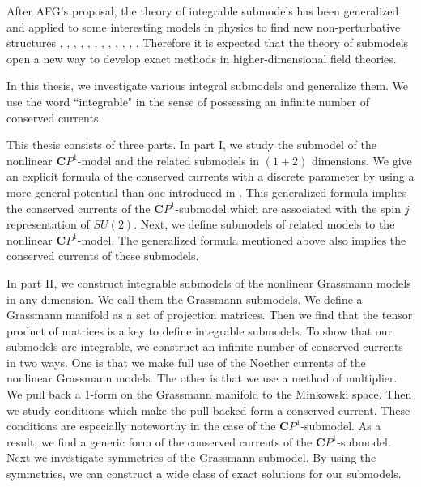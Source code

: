 \documentclass[makeidx,12pt,openany]{report}
\begin{document}
After AFG's proposal, the theory of integrable submodels has been generalized 
and applied to some interesting models in physics to find new non-perturbative 
structures \cite{FS1}, \cite{FS2}, \cite{GMG}, \cite{FHS1}, \cite{FHS2}, 
\cite{FL}, \cite{AFZ1}, \cite{AFZ2}, \cite{Suz}, \cite{FG}, \cite{B}, 
\cite{FR}. 
Therefore it is expected that the theory of submodels open a new way 
to develop exact methods in higher-dimensional field theories. 

In this thesis, we investigate various integral submodels and generalize them. 
We use the word ``integrable" in the sense of possessing an infinite number 
of conserved currents. 

This thesis consists of three parts. 
In part I, we study the submodel of the nonlinear $\mathbf{C}P^1$-model and 
the related submodels in $(1+2)$ dimensions. 
We give an explicit formula of the conserved currents with a discrete 
parameter by using a more general 
potential than one introduced in \cite{AFG1}. 
This generalized formula implies the conserved 
currents of the $\mathbf{C}P^1$-submodel which are associated with the 
spin $j$ representation of $SU(2)$. 
Next, we define submodels of related models to the nonlinear 
$\mathbf{C}P^1$-model. The generalized formula mentioned above also implies 
the conserved currents of these submodels. 

In part II, we construct integrable submodels 
of the nonlinear Grassmann models in any dimension. 
We call them the Grassmann submodels. 
We define a Grassmann manifold as a set of projection matrices. 
Then we find that the tensor product of matrices is a key to define 
integrable submodels. 
To show that our submodels are integrable, 
we construct an infinite number of conserved currents 
in two ways. One is that we make full use of the Noether currents of the 
nonlinear Grassmann models. The other is that we use a method of multiplier. 
We pull back a 1-form on the Grassmann manifold to the Minkowski space. 
Then we study conditions which make the pull-backed form a conserved current. 
These conditions are especially noteworthy 
in the case of the ${\mathbf{C}}P^1$-submodel. 
As a result, we find a generic form of the conserved currents of 
the ${\mathbf{C}}P^1$-submodel. 
Next we investigate symmetries of the Grassmann submodel. 
By using the symmetries, we can construct a wide class of 
exact solutions for our submodels. 
\end{document}
